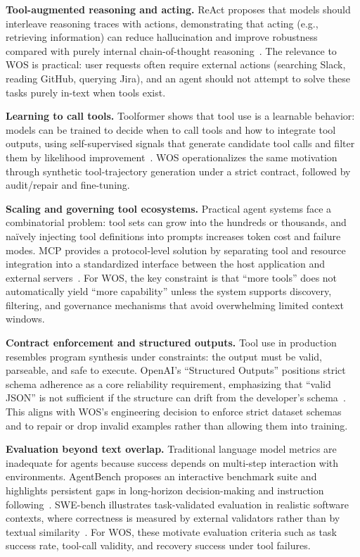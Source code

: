 \documentclass[conference]{IEEEtran}
\begin{document}
\textbf{Tool-augmented reasoning and acting.} ReAct proposes that models should interleave reasoning traces with actions, demonstrating that acting (e.g., retrieving information) can reduce hallucination and improve robustness compared with purely internal chain-of-thought reasoning~\cite{react}. The relevance to WOS is practical: user requests often require external actions (searching Slack, reading GitHub, querying Jira), and an agent should not attempt to solve these tasks purely in-text when tools exist.

\textbf{Learning to call tools.} Toolformer shows that tool use is a learnable behavior: models can be trained to decide when to call tools and how to integrate tool outputs, using self-supervised signals that generate candidate tool calls and filter them by likelihood improvement~\cite{toolformer}. WOS operationalizes the same motivation through synthetic tool-trajectory generation under a strict contract, followed by audit/repair and fine-tuning.

\textbf{Scaling and governing tool ecosystems.} Practical agent systems face a combinatorial problem: tool sets can grow into the hundreds or thousands, and naïvely injecting tool definitions into prompts increases token cost and failure modes. MCP provides a protocol-level solution by separating tool and resource integration into a standardized interface between the host application and external servers~\cite{mcp_spec}. For WOS, the key constraint is that “more tools” does not automatically yield “more capability” unless the system supports discovery, filtering, and governance mechanisms that avoid overwhelming limited context windows.

\textbf{Contract enforcement and structured outputs.} Tool use in production resembles program synthesis under constraints: the output must be valid, parseable, and safe to execute. OpenAI’s “Structured Outputs” positions strict schema adherence as a core reliability requirement, emphasizing that “valid JSON” is not sufficient if the structure can drift from the developer’s schema~\cite{openai_structured_outputs}. This aligns with WOS’s engineering decision to enforce strict dataset schemas and to repair or drop invalid examples rather than allowing them into training.

\textbf{Evaluation beyond text overlap.} Traditional language model metrics are inadequate for agents because success depends on multi-step interaction with environments. AgentBench proposes an interactive benchmark suite and highlights persistent gaps in long-horizon decision-making and instruction following~\cite{agentbench}. SWE-bench illustrates task-validated evaluation in realistic software contexts, where correctness is measured by external validators rather than by textual similarity~\cite{swebench}. For WOS, these motivate evaluation criteria such as task success rate, tool-call validity, and recovery success under tool failures.
\end{document}
